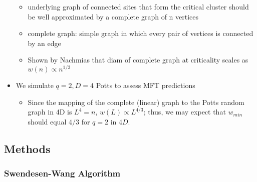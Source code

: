 \documentclass[11pt]{article}
\begin{document}
\begin{itemize}
\begin{itemize}
\item underlying graph of connected sites that form the critical cluster should be well approximated by a complete graph of n vertices\\
\label{sec-4.1.3.5.2}


\item complete graph:  simple graph in which every pair of vertices is connected by an edge\\
\label{sec-4.1.3.5.3}


\item Shown by Nachmias \cite{Nachmiasa} that diam of complete graph at criticality scales as $w(n) \propto n^{1/3}$\\
\label{sec-4.1.3.5.4}

\end{itemize} %

\item We simulate $q=2, D=4$ Potts to assess MFT predictions\\
\label{sec-4.1.3.6}

\begin{itemize}

\item Since the mapping of the complete (linear) graph to the Potts random graph in 4D is $L^4=n$, $w(L) \propto L^{4/3}$; thus, we may expect that $w_{min}$ should equal $4/3$ for $q=2$ in $4D$.\\
\label{sec-4.1.3.6.1}

\end{itemize} %
\end{itemize} %
\subsection{Methods}
\label{sec-4.2}

\subsubsection{Swendesen-Wang Algorithm}
\label{sec-4.2.1}
\end{document}
